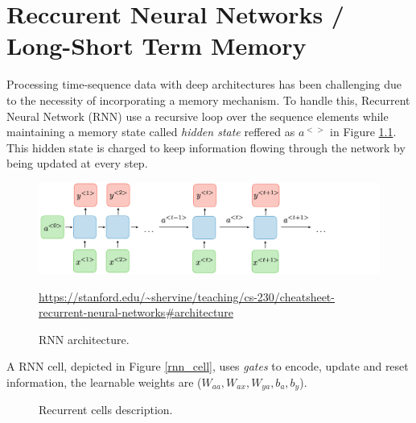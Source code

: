 \documentclass[12pt, a4paper]{report}
\begin{document}
	\chapter{Reccurent Neural Networks / Long-Short Term Memory}\label{appendix_b}
		Processing time-sequence data with deep architectures has been challenging due to the necessity of incorporating a memory mechanism.
		To handle this, Recurrent Neural Network (RNN) use a recursive loop over the sequence elements while maintaining a memory state called {\itshape hidden state} reffered as {\itshape $a^{<>}$} in Figure \ref{rnn}.
		This hidden state is charged to keep information flowing through the network by being updated at every step.
		\begin{figure}[h!]
			\centering
			\includegraphics[width=1.\textwidth]{architecture-rnn-ltr.png}
			\caption{RNN architecture.}
			\url{https://stanford.edu/~shervine/teaching/cs-230/cheatsheet-recurrent-neural-networks#architecture}
			\label{rnn}
		\end{figure}
		A RNN cell, depicted in Figure \ref{rnn_cell}, uses {\itshape gates} to encode, update and reset information, the learnable weights are ({\itshape $W_{aa},W_{ax},W_{ya},b_{a},b_{y}$}).
		\begin{figure}[h!]
			\centering
			\hfill
			\caption{Recurrent cells description.}
		\end{figure}
\end{document}
